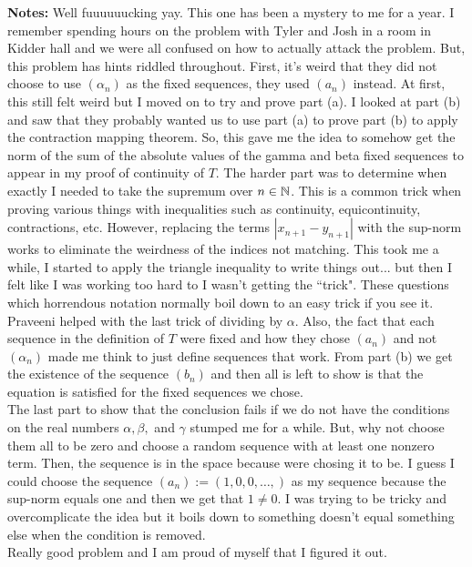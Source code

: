 \documentclass{article}
\begin{document}
\textbf{Notes:} Well fuuuuuucking yay. This one has been a mystery to me for a year. I remember spending hours on the problem with Tyler and Josh in a room in Kidder hall and we were all confused on how to actually attack the problem. But, this problem has hints riddled throughout. First, it's weird that they did not choose to use $(\alpha_n)$ as the fixed sequences, they used $(a_n)$ instead. At first, this still felt weird but I moved on to try and prove part (a). I looked at part (b) and saw that they probably wanted us to use part (a) to prove part (b) to apply the contraction mapping theorem. So, this gave me the idea to somehow get the norm of the sum of the absolute values of the gamma and beta fixed sequences to appear in my proof of continuity of $T$. The harder part was to determine when exactly I needed to take the supremum over $n\in\mathbb N$. This is a common trick when proving various things with inequalities such as continuity, equicontinuity, contractions, etc. However, replacing the terms $|x_{n+1} - y_{n+1}|$ with the sup-norm works to eliminate the weirdness of the indices not matching. This took me a while, I started to apply the triangle inequality to write things out... but then I felt like I was working too hard to I wasn't getting the ``trick". These questions which horrendous notation normally boil down to an easy trick if you see it. Praveeni helped with the last trick of dividing by $\alpha$. Also, the fact that each sequence in the definition of $T$ were fixed and how they chose $(a_n)$ and not $(\alpha_n)$ made me think to just define sequences that work. From part (b) we get the existence of the sequence $(b_n)$ and then all is left to show is that the equation is satisfied for the fixed sequences we chose.\\

The last part to show that the conclusion fails if we do not have the conditions on the real numbers $\alpha, \beta,$ and $\gamma$ stumped me for a while. But, why not choose them all to be zero and choose a random sequence with at least one nonzero term. Then, the sequence is in the space because were chosing it to be. I guess I could choose the sequence $(a_n) := (1, 0, 0, \dots, )$ as my sequence because the sup-norm equals one and then we get that $1\neq 0$. I was trying to be tricky and overcomplicate the idea but it boils down to something doesn't equal something else when the condition is removed.\\

Really good problem and I am proud of myself that I figured it out.\\
\end{document}
